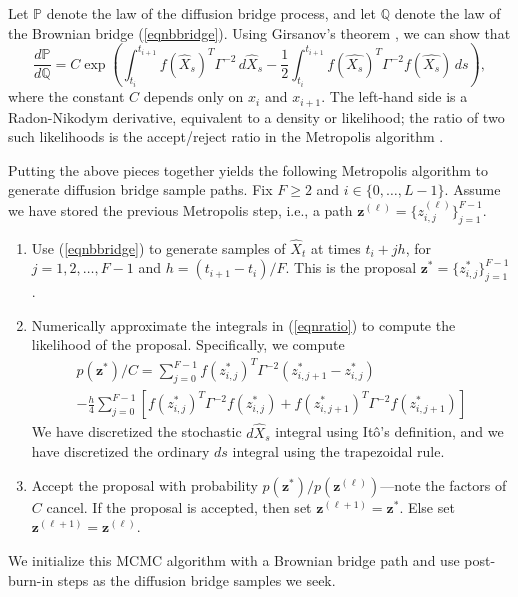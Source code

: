 \documentclass{article}
\newcommand{\bz}{\ensuremath{\mathbf{z}}}
\begin{document}
Let $\mathbb{P}$ denote the law of the diffusion bridge process, and let $\mathbb{Q}$ denote the law of the Brownian bridge (\ref{eqnbbridge}).  Using Girsanov's theorem \cite{papaspiliopoulos_importance_2012}, we can show that
\begin{equation}
\label{eqnratio}
\frac{d \mathbb{P}}{d \mathbb{Q}} = C \exp \left( \int_{t_i}^{t_{i+1}} f(\widehat{X}_s)^T \Gamma^{-2} \, d \widehat{X}_s - \frac{1}{2} \int_{t_i}^{t_{i+1}} f(\widehat{X_s})^T \Gamma^{-2} f(\widehat{X_s}) \, ds \right),
\end{equation}
where the constant $C$ depends only on $x_i$ and $x_{i+1}$.  The left-hand side is a Radon-Nikodym derivative, equivalent to a density or likelihood; the ratio of two such likelihoods is the accept/reject ratio in the Metropolis algorithm 
\cite{stuart_inverse_2010}.

Putting the above pieces together yields the following Metropolis algorithm to generate diffusion bridge sample paths.  Fix $F \geq 2$ and $i \in \{0, \ldots, L-1\}$.  Assume we have stored the previous Metropolis step, i.e., a path $\bz^{(\ell)} = \{z_{i,j}^{(\ell)}\}_{j=1}^{F-1}$.
\begin{enumerate}
\item Use (\ref{eqnbbridge}) to generate samples of $\widehat{X}_t$ at times $t_i + j h$, for $j = 1, 2, \ldots, F-1$ and $h = (t_{i+1} - t_i)/F$.  This is the proposal $\bz^\ast = \{z^\ast_{i,j}\}_{j=1}^{F-1}$.
\item Numerically approximate the integrals in (\ref{eqnratio}) to compute the likelihood of the proposal.  Specifically, we compute
\begin{multline*}
p(\bz^\ast)/C = \sum_{j=0}^{F-1} f(z^\ast_{i,j})^T \Gamma^{-2} (z^\ast_{i,j+1} - z^\ast_{i,j}) \\ - \frac{h}{4} \sum_{j=0}^{F-1} \left[ f(z^\ast_{i,j})^T \Gamma^{-2} f(z^\ast_{i,j}) + f(z^\ast_{i,j+1})^T \Gamma^{-2} f(z^\ast_{i,j+1}) \right]
\end{multline*}
We have discretized the stochastic $d\widehat{X}_s$ integral using It\^{o}'s definition, and we have discretized the ordinary $ds$ integral using the trapezoidal rule.
\item Accept the proposal with probability $p(\bz^\ast)/p(\bz^{(\ell)})$---note the factors of $C$ cancel.  If the proposal is accepted, then set $\bz^{(\ell+1)} = \bz^\ast$. Else set $\bz^{(\ell+1)} = \bz^{(\ell)}$.
\end{enumerate}
We initialize this MCMC algorithm with a Brownian bridge path and use post-burn-in steps as the diffusion bridge samples we seek. 
\end{document}
